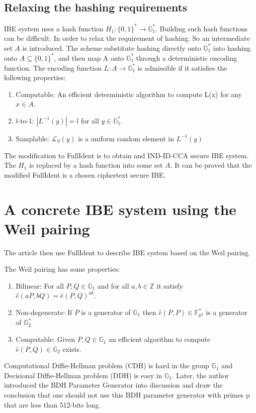 \documentclass[11pt,en]{elegantpaper}
\begin{document}
\subsection{Relaxing the hashing requirements}
IBE system uses a hash function $H_1:\{0,1\}^*\rightarrow\mathbb{G}_1^*$. Building such hash functions can be difficult. In order to relax the requirement of hashing. So an intermediate set $A$ is introduced. The scheme substitute hashing directly onto $\mathbb{G}_1^*$ into hashing onto $A\subseteq\{0,1\}^*$, and then map A onto $\mathbb{G}_1^*$ through a deterministic encoding function. 
The encoding function $L:A\rightarrow\mathbb{G}_1^*$ is admissible if it satisfies the following properties:
\begin{enumerate}
	\item Computable: An efficient deterministic algorithm to compute L(x) for any $x\in A$.
	\item $l$-to-1: $|L^{-1}(y)|=l$ for all $y\in \mathbb{G}_1^*$.
	\item Samplable: $\mathcal{L}_S(y)$ is a uniform random element in $L^{-1}(y)$
\end{enumerate}
The modification to FullIdent is to obtain and IND-ID-CCA secure IBE system. The $H_1$ is replaced by a hash function into some set $A$. It can be proved that the modified FullIdent is a chosen ciphertext secure IBE.
 
\section{A concrete IBE system using the Weil pairing}
The article then use FullIdent to describe IBE system based on the Weil pairing. 

The Weil pairing has some properties:
\begin{enumerate}
	\item Bilinear: For all $P,Q\in \mathbb{G}_1$ and for all $a,b\in \mathbb{Z}$ it satisfy $\hat{e}(a P, b Q)=\hat{e}(P, Q)^{a b}$.
	\item Non-degenerate: If $P$ is a generator of $\mathbb{G}_1$ then $\hat{e}(P, P) \in \mathbb{F}_{p^{2}}^{*}$ is a generator of $\mathbb{G}_2^*$
	\item Computable: Given $P, Q \in \mathbb{G}_{1}$ an efficient algorithm to compute $\hat{e}(P, Q) \in \mathbb{G}_{2}$ exists.
\end{enumerate}
Computational Diffie-Hellman problem (CDH) is hard in the group $\mathbb{G}_1$ and Decisional Diffie-Hellman problem (DDH) is easy in $\mathbb{G}_1$. Later, the author introduced the BDH Parameter Generator into discussion and draw the conclusion that one should not use this BDH parameter generator with primes p that are less than 512-bits long.
\end{document}
